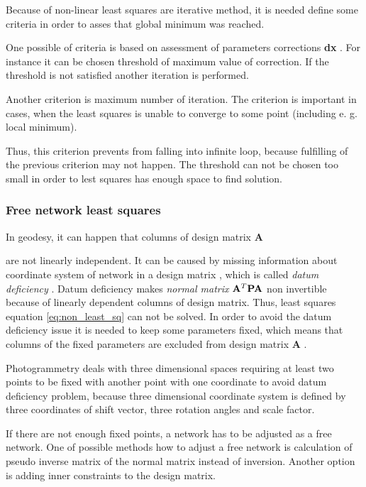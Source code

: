 \documentclass[a4paper,12pt]{article}
\newcommand{\ematr}[1]{
{\bf #1}
}
\newcommand{\evect}[1]{
{\bf #1}
}
\newcommand{\term}[1]{
{\it #1}
}
\begin{document}
Because  of non-linear least squares are iterative method, it is needed define 
some criteria in order to asses that global minimum was reached. 

One possible of criteria \cite{mikhail1976observations} is 
based on assessment of parameters corrections \evect{dx}. 
For instance it can be chosen threshold of maximum value
of correction. If the threshold is not satisfied another 
iteration is performed. 

Another criterion is maximum number of iteration.
The criterion is important in cases, when the least squares 
is unable to converge to some point (including e. g. local minimum).

Thus, this criterion prevents from falling into infinite loop,
because fulfilling of the previous criterion may not happen.
The threshold can not be chosen too small in order to
lest squares has enough space to find solution. 


\subsubsection{Free network least squares}
\label{sec:free_net_least}


In geodesy, it can happen that columns of design matrix \ematr{A}
are not linearly independent. It can be caused by missing information
about coordinate system of network in a design matrix \cite{strang1997linear},
which is called \term{datum deficiency} \cite{deakin2006rank}.
Datum deficiency makes \term{normal matrix} $ \ematr{A}^{T} \ematr{P} \ematr{A}$ non invertible because 
of linearly dependent columns of design matrix. 
Thus,
least squares equation \eqref{eq:non_least_sq} can not be solved.
In order to avoid the datum deficiency issue it is needed to keep some parameters fixed, 
which means that columns of the fixed parameters are excluded from design matrix\ematr{A}.

Photogrammetry deals with three dimensional spaces requiring at least  
two points to be fixed with another point with one coordinate to avoid datum deficiency problem, because
three dimensional coordinate system is defined by three coordinates of shift vector, three rotation angles and scale factor. 

If there are not enough fixed points, a network has to be adjusted as a free network.
One of possible methods how to adjust a free network is calculation of pseudo inverse matrix of the normal matrix instead of
inversion. Another option is adding inner constraints to the design matrix.
\end{document}
